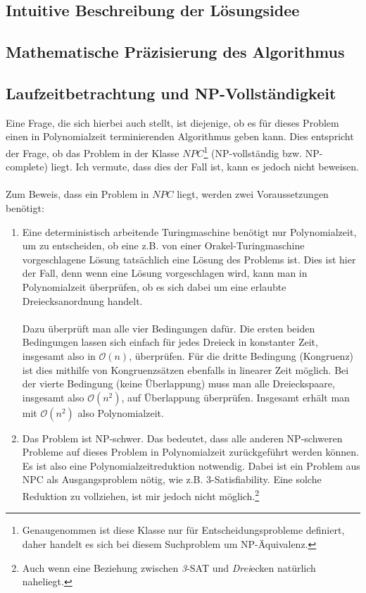 \documentclass[a4paper, notitlepage, 12pt]{scrartcl}
\begin{document}
  \subsection{Intuitive Beschreibung der Lösungsidee}
 \subsection{Mathematische Präzisierung des Algorithmus}
 \subsection{Laufzeitbetrachtung und NP-Vollständigkeit}
 Eine Frage, die sich hierbei auch stellt, ist diejenige, ob es für dieses Problem einen in Polynomialzeit terminierenden Algorithmus geben kann. Dies entspricht der Frage, ob das Problem in der Klasse $NPC$\footnote{Genaugenommen ist diese Klasse nur für Entscheidungsprobleme definiert, daher handelt es sich bei diesem Suchproblem um NP-Äquivalenz.} (NP-vollständig bzw. NP-complete) liegt. Ich vermute, dass dies der Fall ist, kann es jedoch nicht beweisen. \\ \\
 Zum Beweis, dass ein Problem in $NPC$ liegt, werden zwei Voraussetzungen benötigt:
 \begin{enumerate}
 	\item Eine deterministisch arbeitende Turingmaschine benötigt nur Polynomialzeit, um zu entscheiden, ob eine z.B. von einer Orakel-Turingmaschine vorgeschlagene Lösung tatsächlich eine Lösung des Problems ist. Dies ist hier der Fall, denn wenn eine Lösung vorgeschlagen wird, kann man in Polynomialzeit überprüfen, ob es sich dabei um eine erlaubte Dreiecksanordnung handelt. \\ \\ Dazu überprüft man alle vier Bedingungen dafür. Die ersten beiden Bedingungen lassen sich einfach für jedes Dreieck in konstanter Zeit, insgesamt also in $\mathcal{O}(n)$, überprüfen. Für die dritte Bedingung (Kongruenz) ist dies mithilfe von Kongruenzsätzen ebenfalls in linearer Zeit möglich. Bei der vierte Bedingung  (keine Überlappung) muss man alle Dreieckspaare, insgesamt also $\mathcal{O}(n^2)$, auf Überlappung überprüfen. Insgesamt erhält man mit $\mathcal{O}(n^2)$ also Polynomialzeit.
 	\item Das Problem ist NP-schwer. Das bedeutet, dass alle anderen NP-schweren Probleme auf dieses Problem in Polynomialzeit zurückgeführt werden können. Es ist also eine Polynomialzeitreduktion notwendig. Dabei ist ein Problem aus NPC als Ausgangsproblem nötig, wie z.B. 3-Satisfiability. Eine solche Reduktion zu vollziehen, ist mir jedoch nicht möglich.\footnote{Auch wenn eine Beziehung zwischen \textit{3}-SAT und \textit{Drei}ecken natürlich naheliegt.}
 \end{enumerate}
\end{document}
